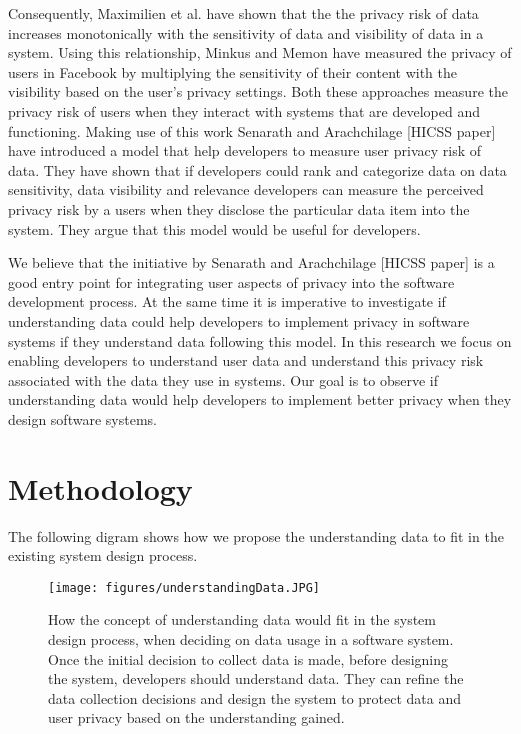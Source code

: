 \documentclass{sigchi}
\begin{document}
Consequently, Maximilien et al. \cite {maximilien2009privacy} have shown that the the privacy risk of data increases monotonically with the sensitivity of data and visibility of data in a system. Using this relationship, Minkus and Memon \cite {minkus2014scale} have measured the privacy of users in Facebook by multiplying the sensitivity of their content with the visibility based on the user's privacy settings. Both these approaches measure the privacy risk of users when they interact with systems that are developed and functioning. Making use of this work Senarath and Arachchilage [HICSS paper] have introduced a model that help developers to measure user privacy risk of data. They have shown that if developers could rank and categorize data on data sensitivity, data visibility and relevance developers can measure the perceived privacy risk by a users when they disclose the particular data item into the system. They argue that this model would be useful for developers.

We believe that the initiative by Senarath and Arachchilage [HICSS paper] is a good entry point for integrating user aspects of privacy into the software development process. At the same time it is imperative to investigate if understanding data could help developers to implement privacy in software systems if they understand data following this model. In this research we focus on enabling developers to understand user data and understand this privacy risk associated with the data they use in systems. Our goal is to observe if understanding data would help developers to implement better privacy when they design software systems. 


\section{Methodology}

 The following digram shows how we propose the understanding data to fit in the existing system design process.

\begin{figure}[h]
\begin{center}
\texttt{[image: figures/understandingData.JPG]}
\caption{How the concept of understanding data would fit in the system design process, when deciding on data usage in a software system. Once the initial decision to collect data is made, before designing the system, developers should understand data. They can refine the data collection decisions and design the system to protect data and user privacy based on the understanding gained. }
\end{center}
\end{figure}
\end{document}
